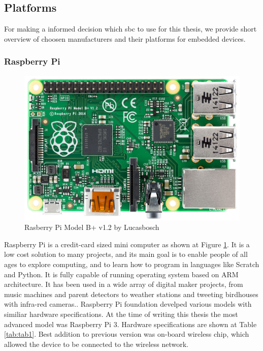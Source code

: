 \subsection{Platforms} %
\label{sub:platforms}
For making a informed decision which \gls{sbc} to use for this thesis, we provide short overview of choosen manufacturers and their platforms for embedded devices.
\subsubsection{Raspberry Pi} %
\label{ssub:raspberry_pi}
\begin{figure}[H]
\begin{center}
\captionsetup{font=small}
\includegraphics[scale=0.2]{pics/rasp.jpg}
\caption{Rasberry Pi Model B+ v1.2 by Lucasbosch}
\label{fig:ch3}
\end{center}
\end{figure}
Raspberry Pi is a credit-card sized mini computer as shown at Figure \ref{fig:ch3}. It is a low cost solution to many projects, and its main goal is to enable people of all ages to explore computing, and to learn how to program in languages like Scratch and Python. It is fully capable of running operating system based on ARM architecture. It has been used in a wide array of digital maker projects, from music machines and parent detectors to weather stations and tweeting birdhouses with infra-red cameras.\cite{raspberry_pi_what}. Raspberry Pi foundation develped various models with similiar hardware specifications. At the time of writing this thesis the most advanced model was Raspberry Pi 3. Hardware specifications are shown at Table \ref{tab:tab1}. Best addition to previous version was on-board wireless chip, which allowed the device to be connected to the wireless network.
